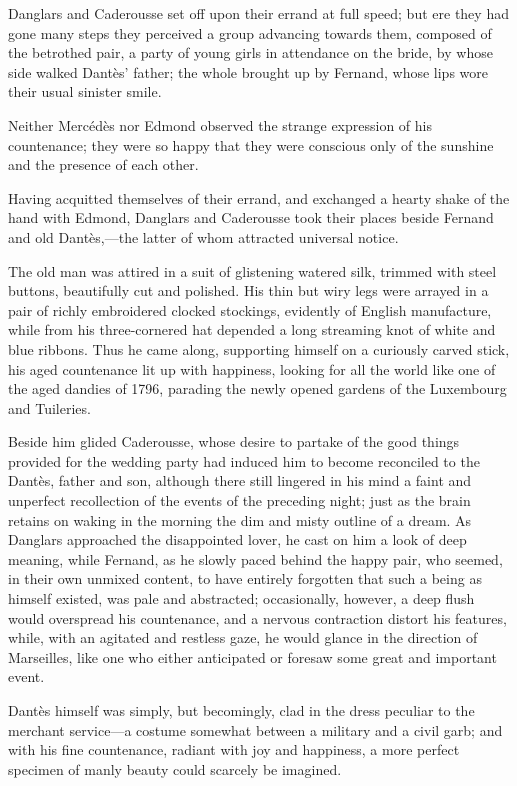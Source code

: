  Danglars and Caderousse set off upon their errand at full speed; but ere they had gone many steps they perceived a group advancing towards them, composed of the betrothed pair, a party of young girls in attendance on the bride, by whose side walked Dantès' father; the whole brought up by Fernand, whose lips wore their usual sinister smile. 

 Neither Mercédès nor Edmond observed the strange expression of his countenance; they were so happy that they were conscious only of the sunshine and the presence of each other. 

 Having acquitted themselves of their errand, and exchanged a hearty shake of the hand with Edmond, Danglars and Caderousse took their places beside Fernand and old Dantès,—the latter of whom attracted universal notice. 

 The old man was attired in a suit of glistening watered silk, trimmed with steel buttons, beautifully cut and polished. His thin but wiry legs were arrayed in a pair of richly embroidered clocked stockings, evidently of English manufacture, while from his three-cornered hat depended a long streaming knot of white and blue ribbons. Thus he came along, supporting himself on a curiously carved stick, his aged countenance lit up with happiness, looking for all the world like one of the aged dandies of 1796, parading the newly opened gardens of the Luxembourg and Tuileries. 

 Beside him glided Caderousse, whose desire to partake of the good things provided for the wedding party had induced him to become reconciled to the Dantès, father and son, although there still lingered in his mind a faint and unperfect recollection of the events of the preceding night; just as the brain retains on waking in the morning the dim and misty outline of a dream.  As Danglars approached the disappointed lover, he cast on him a look of deep meaning, while Fernand, as he slowly paced behind the happy pair, who seemed, in their own unmixed content, to have entirely forgotten that such a being as himself existed, was pale and abstracted; occasionally, however, a deep flush would overspread his countenance, and a nervous contraction distort his features, while, with an agitated and restless gaze, he would glance in the direction of Marseilles, like one who either anticipated or foresaw some great and important event. 

 Dantès himself was simply, but becomingly, clad in the dress peculiar to the merchant service—a costume somewhat between a military and a civil garb; and with his fine countenance, radiant with joy and happiness, a more perfect specimen of manly beauty could scarcely be imagined. 

